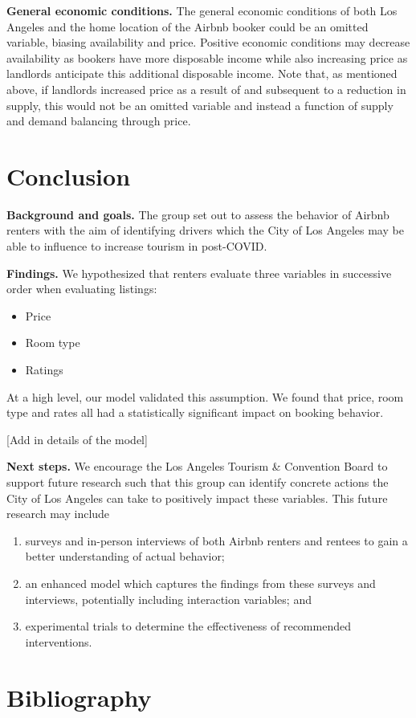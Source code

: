 \documentclass[
]{article}
\begin{document}
\textbf{General economic conditions.} The general economic conditions of both Los Angeles and the home location of the Airbnb booker could be an omitted variable, biasing availability and price. Positive economic conditions may decrease availability as bookers have more disposable income while also increasing price as landlords anticipate this additional disposable income. Note that, as mentioned above, if landlords increased price as a result of and subsequent to a reduction in supply, this would not be an omitted variable and instead a function of supply and demand balancing through price.

\hypertarget{conclusion}{%
\section{Conclusion}\label{conclusion}}

\textbf{Background and goals.} The group set out to assess the behavior of Airbnb renters with the aim of identifying drivers which the City of Los Angeles may be able to influence to increase tourism in post-COVID.

\textbf{Findings.} We hypothesized that renters evaluate three variables in successive order when evaluating listings:

\begin{itemize}
\item
  Price
\item
  Room type
\item
  Ratings
\end{itemize}

At a high level, our model validated this assumption. We found that price, room type and rates all had a statistically significant impact on booking behavior.

{[}Add in details of the model{]}

\textbf{Next steps.} We encourage the Los Angeles Tourism \& Convention Board to support future research such that this group can identify concrete actions the City of Los Angeles can take to positively impact these variables. This future research may include

\begin{enumerate}
\def\labelenumi{(\roman{enumi})}
\item
  surveys and in-person interviews of both Airbnb renters and rentees to gain a better understanding of actual behavior;
\item
  an enhanced model which captures the findings from these surveys and interviews, potentially including interaction variables; and
\item
  experimental trials to determine the effectiveness of recommended interventions.
\end{enumerate}

\hypertarget{bibliography}{%
\section{Bibliography}\label{bibliography}}
\end{document}
